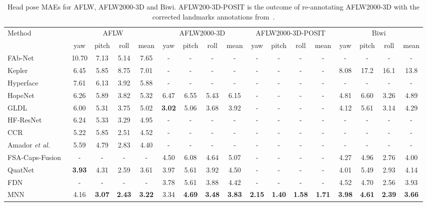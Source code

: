 \documentclass[9pt,technote,compsoc]{IEEEtran}
\newcommand{\etal}{\emph{et al.}}
\begin{document}
\begin{table*}[htbp!]
\begin{center}
\setlength\tabcolsep{5.0pt}
\begin{tabular}{l|ccc|c|ccc|c|ccc|c|ccc|c}
\hline
\multirow{2}{*}{Method} & \multicolumn{4}{c|}{AFLW} & \multicolumn{4}{c|}{AFLW2000-3D} & \multicolumn{4}{c|}{AFLW2000-3D-POSIT} & \multicolumn{4}{c}{Biwi}\\
 & yaw & pitch & roll & mean & yaw & pitch & roll & mean & yaw & pitch & roll & mean & yaw & pitch & roll & mean\\
 \hline
FAb-Net~\cite{Wiles18b} & 10.70 & 7.13 & 5.14 & 7.65 & - & - & - & - & - & - & - & - & - & - & - & -\\
Kepler~\cite{Kumar18b} & 6.45 & 5.85 & 8.75 & 7.01 & - & - & - & - & - & - & - & - & 8.08 & 17.2 & 16.1 & 13.8\\
Hyperface~\cite{Ranjan19} & 7.61 & 6.13 & 3.92 & 5.88 & - & - & - & - & - & - & - & - & - & - & - & -\\
HopeNet~\cite{Ruiz18} & 6.26 & 5.89 & 3.82 & 5.32 & 6.47 & 6.55 & 5.43 & 6.15 & - & - & - & - & 4.81 & 6.60 & 3.26 & 4.89\\
GLDL~\cite{Liu19b} & 6.00 & 5.31 & 3.75 & 5.02 & \textbf{3.02} & 5.06 & 3.68 & 3.92 & - & - & - & - & 4.12 & 5.61 & 3.14 & 4.29\\
HF-ResNet\cite{Ranjan19} & 6.24 & 5.33 & 3.29 & 4.95 & - & - & - & - & - & - & - & - & - & - & - & -\\
CCR~\cite{Zhang18c} & 5.22 & 5.85 & 2.51 & 4.52 & - & - & - & - & - & - & - & - & - & - & - & -\\
Amador \etal~\cite{Amador17} & 5.59 & 4.79 & 2.83 & 4.40 & - & - & - & - & - & - & - & - & - & - & - & -\\
FSA-Caps-Fusion~\cite{Yang19} & - & - & - & - & 4.50 & 6.08 & 4.64 & 5.07 & - & - & - & - & 4.27 & 4.96 & 2.76 & 4.00\\
QuatNet~\cite{Hsu18} & \textbf{3.93} & 4.31 & 2.59 & 3.61 & 3.97 & 5.61 & 3.92 & 4.50 & - & - & - & - & 4.01 & 5.49 & 2.93 & 4.14\\
FDN~\cite{Zhang20} & - & - & - & - & 3.78 & 5.61 & 3.88 & 4.42 & - & - & - & - & 4.52 & 4.70 & 2.56 & 3.93\\
\hline
MNN & 4.16 & \textbf{3.07} & \textbf{2.43} & \textbf{3.22} & 3.34 & \textbf{4.69} & \textbf{3.48} & \textbf{3.83} & \textbf{2.15} & \textbf{1.40} & \textbf{1.58} & \textbf{1.71} & \textbf{3.98} & \textbf{4.61} & \textbf{2.39} & \textbf{3.66}\\
\hline
\end{tabular}
\end{center}
\caption{Head pose MAEs for AFLW, AFLW2000-3D and Biwi. AFLW200-3D-POSIT is the outcome of re-annotating AFLW2000-3D with the corrected landmarks annotations from~\cite{Bulat17b}.}
\label{table:multitask_headpose_results}
\end{table*}
\end{document}
